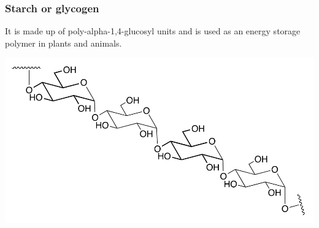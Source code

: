 \documentclass[11pt]{article}
\begin{document}
\newpage

\subsubsection{Starch or glycogen}
\label{sec:org76cdae1}
It is made up of poly-alpha-1,4-glucosyl units and is used as an energy storage polymer in plants and animals.
\begin{center}
\includegraphics[width=.9\linewidth]{./images/starch.png}
\end{center}
\end{document}
